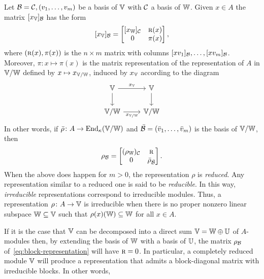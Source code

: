 Let $\mathcal B=\mathcal C,(v_1,\dots,v_m)$ be a basis of $\mathbb V$ with $\mathcal C$ a basis of $\mathbb W$. Given $x\in A$ the matrix $[x_\mathbb V]_{\mathcal B}$ has the form
\begin{equation}\label{eq:reduced-representation}
    [x_\mathbb V]_{\mathcal B}=\begin{bmatrix}
        [x_\mathbb W]_{\mathcal C} &{\textsc r}(x)\\
        0   &\pi(x)
    \end{bmatrix},
\end{equation}
where $({\textsc r}(x),\pi(x))$ is the $n\times m$ matrix with columns $[xv_1]_{\mathcal B},\dots,[xv_m]_{\mathcal B}$. Moreover, $\pi\colon x\mapsto\pi(x)$ is the matrix representation of the representation of $A$ in $\mathbb V/\mathbb W$ defined by $x\mapsto x_{\mathbb V/\mathbb W}$, induced by $x_\mathbb V$ according to the diagram
$$
    \begin{tikzcd}
        \V
                \arrow[r,"x_\V"]
                \arrow[d]
            &\V
                \arrow[d]\\
        \V/\W
                \arrow[r,"x_{\V/\W}"']
            &\V/\W
    \end{tikzcd}
$$
In other words, if $\bar\rho\colon A\to{\operatorname{End}}_\kappa(\mathbb V/\mathbb W)$ and $\bar{\mathcal B}=(\bar v_1,\dots,\bar v_m)$ is the basis of $\mathbb V/\mathbb W$, then
\begin{equation}\label{eq:block-representation}
    \rho_{\mathcal B}=\begin{bmatrix}
        (\rho_\mathbb W)_{\mathcal C}    &\textsc r\\
        0   &\bar\rho_{\bar{\mathcal B}}
    \end{bmatrix}.
\end{equation}
When the above does happen for $m>0$, the representation $\rho$ is \textsl{reduced}. Any representation similar to a reduced one is said to be \textsl{reducible}. In this way, \textsl{irreducible\/} representations correspond to irreducible modules. Thus, a representation $\rho\colon A\to\mathbb V$ is irreducible when there is no proper nonzero linear subspace $\mathbb W\subseteq\mathbb V$ such that $\rho(x)(\mathbb W)\subseteq\mathbb W$ for all $x\in A$.

If it is the case that $\mathbb V$ can be decomposed into a direct sum $\mathbb V=\mathbb W\oplus\mathbb U$ of $A$-modules then, by extending the basis of $\mathbb W$ with a basis of $\mathbb U$, the matrix $\rho_{\mathcal B}$ of~\eqref{eq:block-representation} will have $\textsc r=0$. In particular, a completely reduced module $\mathbb V$ will produce a representation that admits a block-diagonal matrix with irreducible blocks. In other words,

